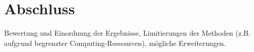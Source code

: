\chapter{Abschluss} \label{chapter:4}
Bewertung und Einordnung der Ergebnisse, Limitierungen der Methoden (z.B. aufgrund begrenzter Computing-Ressourcen), mögliche Erweiterungen.